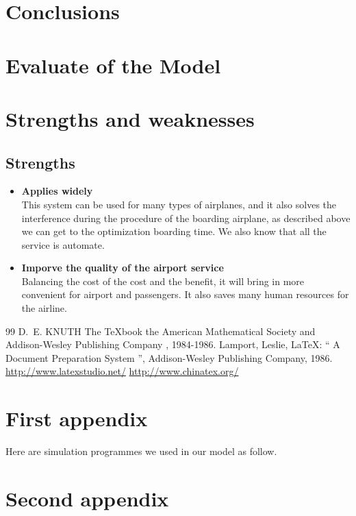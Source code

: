 \documentclass{mcmthesis}
\begin{document}
\section{Conclusions}
\section{Evaluate of the Model}
\section{Strengths and weaknesses}
\subsection{Strengths}
\begin{itemize}
\item \textbf{Applies widely}\\
This system can be used for many types of airplanes, and it also
solves the interference during the procedure of the boarding airplane,
as described above we can get to the optimization
boarding time. We also know that all the service is automate.
\item \textbf{Imporve the quality of the airport service}\\
Balancing the cost of the cost and the benefit, it will bring in more convenient
for airport and passengers. It also saves many human resources for the airline.
\end{itemize}
\begin{thebibliography} {99}
   D.~E. KNUTH   The \TeX{}book  the American
  Mathematical Society and Addison-Wesley
  Publishing Company , 1984-1986.
  Lamport, Leslie,  \LaTeX{}: `` A Document Preparation System '',
  Addison-Wesley Publishing Company, 1986.
  \url{http://www.latexstudio.net/}
  \url{http://www.chinatex.org/}
\end{thebibliography}

\begin{appendices}
  \section{First appendix}
  Here are simulation programmes we used in our model as follow.\\
  \section{Second appendix}
\end{appendices}
\end{document}
